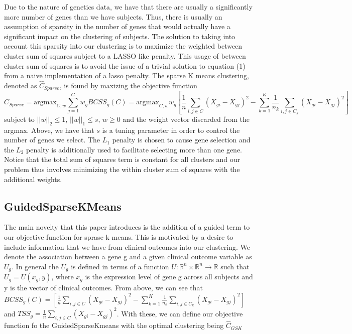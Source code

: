 \documentclass{statsoc}
\newcommand{\RR}{\mathbb{R}}
\begin{document}
Due to the nature of genetics data, we have that there are usually a significantly more number of genes than we have subjects. Thus, there is usually an assumption of sparsity in the number of genes that would actually have a significant impact on the clustering of subjects. The solution to taking into account this sparsity into our clustering is to maximize the weighted between cluster sum of squares subject to a LASSO like penalty. This usage of between cluster sum of squares is to avoid the issue of a trivial solution to equation (1) from a naive implementation of a lasso penalty. The sparse K means clustering, denoted as $\hat{C}_{Sparse}$, is found by maxizing the objective function 
\begin{equation}
    \hat{C}_{Sparse} = \textrm{argmax}_{C,w} \sum_{g=1}^G w_g BCSS_g(C) = \textrm{argmax}_{C,w} w_g\left[\frac{1}{n} \sum_{i,j \in C} (X_{gi} - X_{gj})^2 - \sum_{k=1}^K \frac{1}{n_k}\sum_{i,j \in C_k} (X_{gi} - X_{gj})^2 \right]
\end{equation}
subject to $||w||_2 \leq 1$, $||w||_1 \leq s$, $w \geq 0$ and the weight vector discarded from the argmax. Above, we have that $s$ is a tuning parameter in order to control the number of genes we select. The $L_1$ penalty is chosen to cause gene selection and the $L_2$ penalty is additionally used to facilitate selecting more than one gene. Notice that the total sum of squares term is constant for all clusters and our problem thus involves minimizing the within cluster sum of squares with the additional weights.
    

\subsection{GuidedSparseKMeans}

The main novelty that this paper introduces is the addition of a guided term to our objective function for sprase k means. This is motivated by a desire to include information that we have from clinical outcomes into our clustering. We denote the association between a gene g and a given clinical outcome variable as $U_g$. In general the $U_g$ is defined in terms of a function $U: \RR^n \times \RR^n \rightarrow \RR$ such that $U_g = U(x_g, y)$, where $x_g$ is the expression level of gene g across all subjects and y is the vector of clinical outcomes. From above, we can see that $BCSS_g(C) = \left[\frac{1}{n} \sum_{i,j \in C} (X_{gi} - X_{gj})^2 - \sum_{k=1}^K \frac{1}{n_k}\sum_{i,j \in C_k} (X_{gi} - X_{gj})^2 \right]$ and $TSS_g = \frac{1}{n} \sum_{i,j \in C} (X_{gi} - X_{gj})^2$. With these, we can define our objective function fo the GuidedSparseKmeans with the optimal clustering being $\hat{C}_{GSK}$
\end{document}
